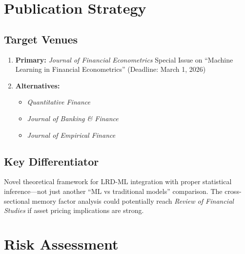 \documentclass[11pt,a4paper]{article}
\theoremstyle{definition}
\begin{document}
\section{Publication Strategy}

\subsection{Target Venues}

\begin{enumerate}
    \item \textbf{Primary:} \textit{Journal of Financial Econometrics} Special Issue on ``Machine Learning in Financial Econometrics'' (Deadline: March 1, 2026)
    
    \item \textbf{Alternatives:}
    \begin{itemize}
        \item \textit{Quantitative Finance}
        \item \textit{Journal of Banking \& Finance}
        \item \textit{Journal of Empirical Finance}
    \end{itemize}
\end{enumerate}

\subsection{Key Differentiator}

Novel theoretical framework for LRD-ML integration with proper statistical inference---not just another ``ML vs traditional models'' comparison. The cross-sectional memory factor analysis could potentially reach \textit{Review of Financial Studies} if asset pricing implications are strong.

\section{Risk Assessment}
\end{document}
